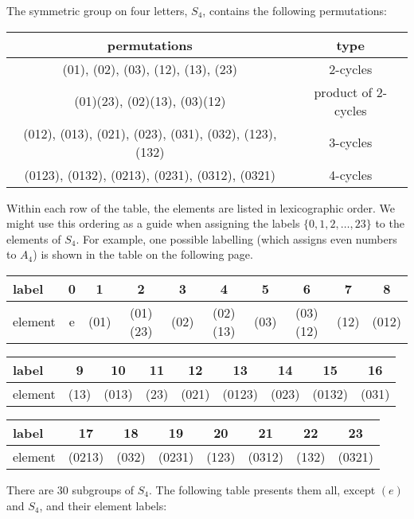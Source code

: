 
The symmetric group on four letters, $S_4$, contains the following permutations:
\begin{center}
\begin{tabular}{|c|c|}
\hline
permutations & type\\[4pt]
\hline
(01), (02), (03), (12), (13), (23) & 2-cycles \\[4pt]
(01)(23), (02)(13), (03)(12) & product of 2-cycles \\[4pt]
(012), (013), (021), (023), (031), (032), (123), (132) &  3-cycles \\[4pt]
(0123), (0132), (0213), (0231), (0312), (0321) & 4-cycles \\[4pt]
\hline
\end{tabular}
\end{center}

Within each row of the table, the elements are listed in lexicographic order.  We might
use this ordering as a guide when assigning the labels $\{0, 1, 2, \ldots, 23\}$ to
the elements of $S_4$.  For example, one possible labelling 
(which assigns even numbers to $A_4$) is shown in the table on the following page.
\\

{\scriptsize
\begin{tabular}{|l|c|c|c|c|c|c|c|c|c|}
\hline
label& 0&1& 2& 3& 4& 5& 6& 7& 8\\
\hline
element&
 e &
(01)&
(01)(23)&
(02)&
(02)(13)&
(03)&
(03)(12)&
(12)&
(012)\\
\hline
\end{tabular}
}

{\scriptsize
\begin{tabular}{|l|c|c|c|c|c|c|c|c|}
\hline
label & 9& 10& 11& 12& 13& 14& 15& 16\\
\hline
element &(13)&(013)& (23)&(021)&(0123)&(023)&(0132)&(031)\\
\hline
\end{tabular}
}

{\scriptsize
\begin{tabular}{|l|c|c|c|c|c|c|c|}
\hline
label& 17& 18& 19& 20& 21& 22& 23\\
\hline
element &(0213)&(032)&(0231)&(123)&(0312)&(132)&(0321)\\
\hline
\end{tabular}
}

\newpage
There are 30 subgroups of $S_4$. The following table presents
them all, except $(e)$ and $S_4$, and their element labels:


